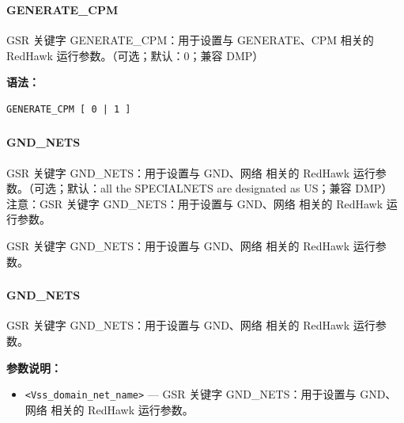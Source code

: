 \subsubsection{}
\paragraph*{GENERATE_CPM}

GSR 关键字 GENERATE_CPM：用于设置与 GENERATE、CPM 相关的 RedHawk 运行参数。（可选；默认：0；兼容 DMP）

\textbf{语法：}
\begin{lstlisting}
GENERATE_CPM [ 0 | 1 ]
\end{lstlisting}

\subsubsection{}
\paragraph*{GND_NETS}

GSR 关键字 GND_NETS：用于设置与 GND、网络 相关的 RedHawk 运行参数。（可选；默认：all the SPECIALNETS are designated as US；兼容 DMP） 注意：GSR 关键字 GND_NETS：用于设置与 GND、网络 相关的 RedHawk 运行参数。

\begin{noteBox}
GSR 关键字 GND\_NETS：用于设置与 GND、网络 相关的 RedHawk 运行参数。
\end{noteBox}

\subsubsection{}
\paragraph*{GND_NETS}

GSR 关键字 GND_NETS：用于设置与 GND、网络 相关的 RedHawk 运行参数。

\textbf{参数说明：}
\begin{itemize}
\item \texttt{<Vss\_domain\_net\_name>} — GSR 关键字 GND\_NETS：用于设置与 GND、网络 相关的 RedHawk 运行参数。
\end{itemize}

\subsubsection{}

